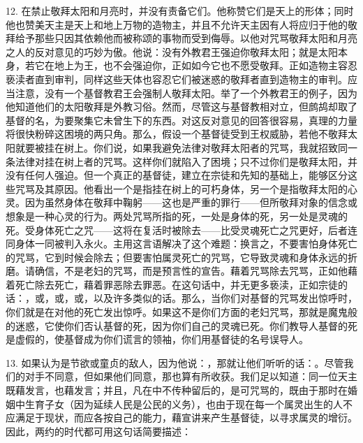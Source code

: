12. 在禁止敬拜太阳和月亮时，并没有责备它们。他称赞它们是天上的形体；同时他也赞美天主是天上和地上万物的造物主，并且不允许天主因有人将应归于他的敬拜给予那些只因其依赖他而被称颂的事物而受到侮辱。以他对咒骂敬拜太阳和月亮之人的反对意见的巧妙为傲。他说：没有外教君王强迫你敬拜太阳；就是太阳本身，若它在地上为王，也不会强迫你，正如如今它也不愿受敬拜。正如造物主容忍亵渎者直到审判，同样这些天体也容忍它们被迷惑的敬拜者直到造物主的审判。应当注意，没有一个基督教君王会强制人敬拜太阳。举了一个外教君王的例子，因为他知道他们的太阳敬拜是外教习俗。然而，尽管这与基督教相对立，但鹧鸪却取了基督的名，为要聚集它未曾生下的东西。对这反对意见的回答很容易，真理的力量将很快粉碎这困境的两只角。那么，假设一个基督徒受到王权威胁，若他不敬拜太阳就要被挂在树上。你们说，如果我避免法律对敬拜太阳者的咒骂，我就招致同一条法律对挂在树上者的咒骂。这样你们就陷入了困境；只不过你们是敬拜太阳，并没有任何人强迫。但一个真正的基督徒，建立在宗徒和先知的基础上，能够区分这些咒骂及其原因。他看出一个是指挂在树上的可朽身体，另一个是指敬拜太阳的心灵。因为虽然身体在敬拜中鞠躬——这也是严重的罪行——但所敬拜对象的信念或想象是一种心灵的行为。两处咒骂所指的死，一处是身体的死，另一处是灵魂的死。受身体死亡之咒——这将在复活时被除去——比受灵魂死亡之咒更好，后者连同身体一同被判入永火。主用这言语解决了这个难题：换言之，不要害怕身体死亡的咒骂，它到时候会除去；但要害怕属灵死亡的咒骂，它导致灵魂和身体永远的折磨。请确信，不是老妇的咒骂，而是预言性的宣告。藉着咒骂除去咒骂，正如他藉着死亡除去死亡，藉着罪恶除去罪恶。在这句话中，并无更多亵渎，正如宗徒的话：，或，或，或，以及许多类似的话。那么，当你们对基督的咒骂发出惊呼时，你们就是在对他的死亡发出惊呼。如果这不是你们方面的老妇咒骂，那就是魔鬼般的迷惑，它使你们否认基督的死，因为你们自己的灵魂已死。你们教导人基督的死是虚假的，使基督成为你们谎言的领袖，你们用基督徒的名号误导人。\par

13. 如果认为是节欲或童贞的敌人，因为他说：，那就让他们听听的话：。尽管我们的对手不同意，但如果他们同意，那也算有所收获。我们足以知道：同一位天主既藉发言，也藉发言；并且，凡在中不传种留后的，是可咒骂的，既由于那时在婚姻中生育子女（因为延续人民是公民的义务），也由于现在每一个属灵出生的人不应满足于现状，而应各按自己的能力，藉宣讲来产生基督徒，以寻求属灵的增衍。因此，两约的时代都可用这句话简要描述：\par

